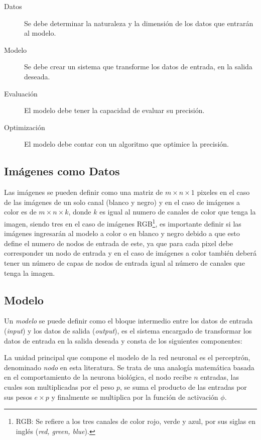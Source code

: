 \begin{description}
    \item[Datos]{Se debe determinar la naturaleza y la dimensión de los datos que entrarán al modelo.}
    \item[Modelo] {Se debe crear un sistema que transforme los datos de entrada, en la salida deseada.}
    \item[Evaluación] {El modelo debe tener la capacidad de evaluar su precisión.}
    \item[Optimización] {El modelo debe contar con un algoritmo que optimice la precisión.}
\end{description}

\subsection{Imágenes como Datos}
Las imágenes se pueden definir como una matriz de $m \times n \times 1$ pixeles en el caso de las imágenes de un solo canal (blanco y negro) y en el caso de imágenes a color es de $m \times n \times k$, donde $k$ es igual al numero de canales de color que tenga la imagen, siendo tres en el caso de imágenes RGB\footnote{RGB: Se refiere a los tres canales de color rojo, verde y azul, por sus siglas en inglés (\emph{red, green, blue}).}, es importante definir si las imágenes ingresarán al modelo a color o en blanco y negro debido a que esto define el numero de nodos de entrada de este, ya que para cada pixel debe corresponder un nodo de entrada y en el caso de imágenes a color también deberá tener un número de capas de nodos de entrada igual al número de canales que tenga la imagen.


\subsection{Modelo}
Un \emph{modelo} se puede definir como el bloque intermedio entre los datos de entrada (\emph{input}) y los datos de salida (\emph{output}), es el sistema encargado de transformar los datos de entrada en la salida deseada y consta de los siguientes componentes:

La unidad principal que compone el modelo de la red neuronal es el perceptrón, denominado \emph{nodo} en esta literatura. Se trata de una analogía matemática basada en el comportamiento de la neurona biológica, el nodo recibe $n$ entradas, las cuales son multiplicadas por el peso $p$, se suma el producto de las entradas por sus pesos $ e \times p$ y finalmente se multiplica por la función de activación $\phi$. 

